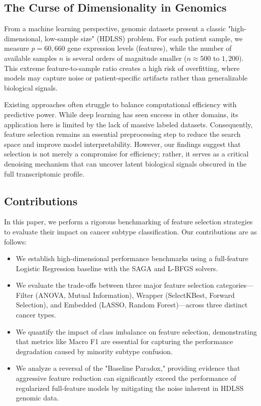 \documentclass{article}
\begin{document}
\subsection{The Curse of Dimensionality in Genomics}

From a machine learning perspective, genomic datasets present a classic "high-dimensional, low-sample size" (HDLSS) problem. For each patient sample, we measure $p = 60,660$ gene expression levels (features), while the number of available samples $n$ is several orders of magnitude smaller ($n \approx 500$ to $1,200$). This extreme feature-to-sample ratio creates a high risk of overfitting, where models may capture noise or patient-specific artifacts rather than generalizable biological signals. 

Existing approaches often struggle to balance computational efficiency with predictive power. While deep learning has seen success in other domains, its application here is limited by the lack of massive labeled datasets. Consequently, feature selection remains an essential preprocessing step to reduce the search space and improve model interpretability. However, our findings suggest that selection is not merely a compromise for efficiency; rather, it serves as a critical denoising mechanism that can uncover latent biological signals obscured in the full transcriptomic profile.

\subsection{Contributions}

In this paper, we perform a rigorous benchmarking of feature selection strategies to evaluate their impact on cancer subtype classification. Our contributions are as follows:
\begin{itemize}
    \item We establish high-dimensional performance benchmarks using a full-feature Logistic Regression baseline with the SAGA and L-BFGS solvers.
    \item We evaluate the trade-offs between three major feature selection categories—Filter (ANOVA, Mutual Information), Wrapper (SelectKBest, Forward Selection), and Embedded (LASSO, Random Forest)—across three distinct cancer types.
    \item We quantify the impact of class imbalance on feature selection, demonstrating that metrics like Macro F1 are essential for capturing the performance degradation caused by minority subtype confusion.
    \item We analyze a reversal of the "Baseline Paradox," providing evidence that aggressive feature reduction can significantly exceed the performance of regularized full-feature models by mitigating the noise inherent in HDLSS genomic data.
\end{itemize}
\end{document}
